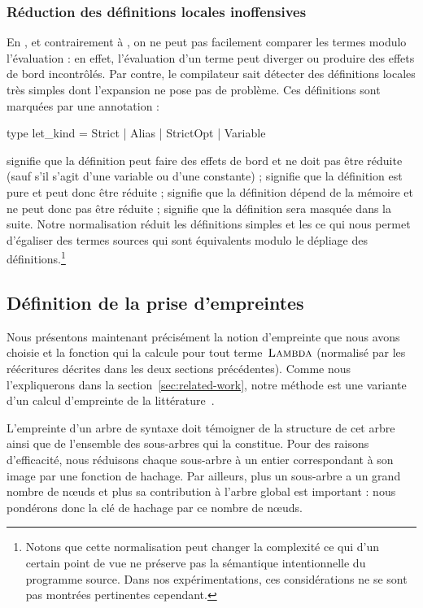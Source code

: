 \subsubsection{Réduction des définitions locales inoffensives}

En {\OCaml}, et contrairement à {\Coq}, on ne peut pas facilement
comparer les termes modulo l'évaluation : en effet, l'évaluation d'un
terme peut diverger ou produire des effets de bord incontrôlés.
%
Par contre, le compilateur sait détecter des définitions locales
très simples dont l'expansion ne pose pas de problème. Ces définitions
sont marquées par une annotation :

\begin{ocaml}
type let_kind = Strict | Alias | StrictOpt | Variable
\end{ocaml}

\noindent {} signifie que la définition peut faire
des effets de bord et ne doit pas être réduite (sauf s'il s'agit d'une
variable ou d'une constante) ;  signifie que la
définition est pure et peut donc être réduite ; 
signifie que la définition dépend de la mémoire et ne peut donc pas
être réduite ;  signifie que la définition sera
masquée dans la suite. Notre normalisation réduit les
définitions  simples et les  ce qui
nous permet d'égaliser des termes sources qui sont équivalents modulo
le dépliage des définitions.\footnote{Notons que cette normalisation
peut changer la complexité ce qui d'un certain point de vue ne préserve
pas la sémantique intentionnelle du programme source. Dans nos
expérimentations, ces considérations ne se sont pas montrées pertinentes
cependant.}

\subsection{Définition de la prise d'empreintes}
\label{sec:fingerprint}

Nous présentons maintenant précisément la notion d'empreinte que nous
avons choisie et la fonction qui la calcule pour tout
terme~$\textsc{Lambda}$ (normalisé par les réécritures décrites dans les
deux sections précédentes). Comme nous l'expliquerons dans la
section~\ref{sec:related-work}, notre méthode est une variante d'un
calcul d'empreinte de la littérature~\cite{chilowicz:hal-00627811}.

L'empreinte d'un arbre de syntaxe doit témoigner de la structure de
cet arbre ainsi que de l'ensemble des sous-arbres qui la constitue. Pour
des raisons d'efficacité, nous réduisons chaque sous-arbre à un entier
correspondant à son image par une fonction de hachage. Par ailleurs,
plus un sous-arbre a un grand nombre de n{\oe}uds et plus sa
contribution à l'arbre global est important : nous pondérons donc
la clé de hachage par ce nombre de n{\oe}uds.

